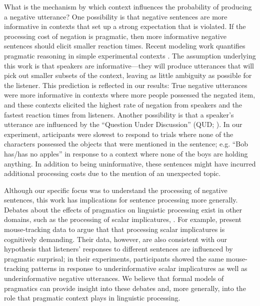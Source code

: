 \documentclass[man, noapacite]{apa2}
\begin{document}
What is the mechanism by which context influences the probability of producing a negative utterance?  One possibility is that negative sentences are more informative in contexts that set up a strong expectation that is violated. If the processing cost of negation is pragmatic, then more informative negative sentences should elicit smaller reaction times.  Recent modeling work quantifies pragmatic reasoning in simple experimental contexts \cite{frank2012,goodman2013}. The assumption underlying this work is that speakers are informative---they will produce utterances that will pick out smaller subsets of the context, leaving as little ambiguity as possible for the listener.  This prediction is reflected in our results: True negative utterances were more informative in contexts where more people possessed the negated item, and these contexts elicited the highest rate of negation from speakers and the fastest reaction times from listeners. Another possibility is that a speaker's utterance are influenced by the ``Question Under Discussion'' (QUD; ). In our experiment, articipants were slowest to respond to trials where none of the characters possessed the objects that were mentioned in the sentence; e.g. ``Bob has/has no apples'' in response to a context where none of the boys are holding anything.  In addition to being uninformative, these sentences might have incurred additional processing costs due to the mention of an unexpected topic.  



Although our specific focus was to understand the processing of negative sentences, this work has implications for sentence processing more generally.  Debates about the effects of pragmatics on linguistic processing exist in other domains, such as the processing of scalar implicatures, .  For example,  present mouse-tracking data to argue that that processing scalar implicatures is cognitively demanding. Their data, however, are also consistent with our hypothesis that listeners' responses to different sentences are influenced by pragmatic surprisal; in their experiments, participants showed the same mouse-tracking patterns in response to underinformative scalar implicatures as well as underinformative negative utterances.  We believe that formal models of pragmatics can provide insight into these debates and, more generally, into the role that pragmatic context plays in linguistic processing. 
 





\setlength{\bibleftmargin}{.125in}
\setlength{\bibindent}{-\bibleftmargin}


\end{document}
